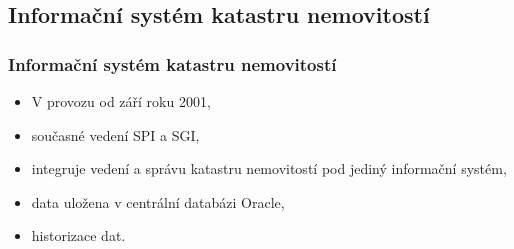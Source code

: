 \documentclass{beamer}
\begin{document}

\subsection{Informační systém katastru nemovitostí}

\begin{frame}
\frametitle{Informační systém katastru nemovitostí}

\begin{itemize}
 \item V provozu od září roku 2001,
 \item současné vedení SPI a SGI,
 \item integruje vedení a správu katastru nemovitostí pod jediný informační systém,
 \item data uložena v centrální databázi Oracle,
 \item historizace dat.
\end{itemize}

\end{frame}

\end{document}
